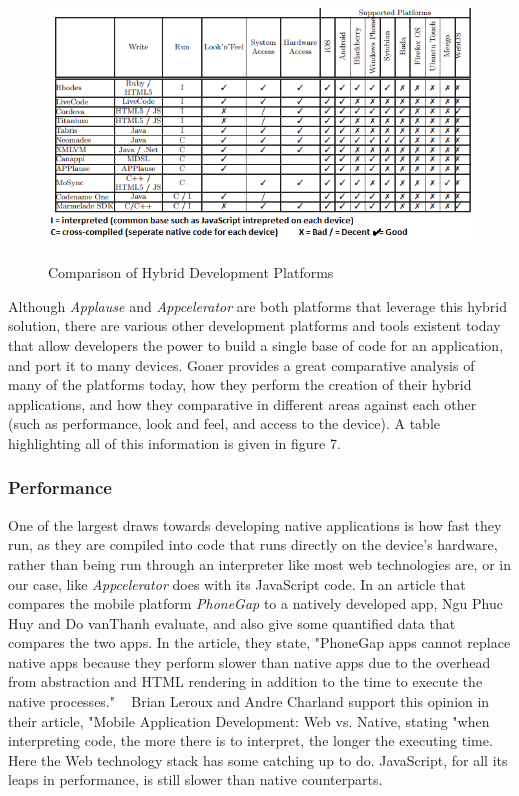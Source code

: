 \documentclass[11pt, twocolumn]{article}
\begin{document}
\begin{figure}
\includegraphics[width=\textwidth, height=7cm]{cross-platform-chart}
\caption{Comparison of Hybrid Development Platforms ~\cite{Goaer2013}}
\end{figure}

Although {\it Applause} and {\it Appcelerator} are both platforms that leverage this hybrid solution, there are various other development platforms and tools existent today that allow developers the power to build a single base of code for an application, and port it to many devices.  Goaer provides a great comparative analysis of many of the platforms today, how they perform the creation of their hybrid applications, and how they comparative in different areas against each other (such as performance, look and feel, and access to the device).  A table highlighting all of this information is given in figure 7. \\

\subsubsection{Performance}
One of the largest draws towards developing native applications is how fast they run, as they are compiled into code that runs directly on the device's hardware, rather than being run through an interpreter like most web technologies are, or in our case, like {\it Appcelerator} does with its JavaScript code.  In an article that compares the mobile platform {\it PhoneGap} to a natively developed app, Ngu Phuc Huy and Do vanThanh evaluate, and also give some quantified data that compares the two apps.  In the article, they state, "PhoneGap apps cannot replace native apps because they perform slower than native apps due to the overhead from abstraction and HTML rendering in addition to the time to execute the native processes." ~\cite{Huy2012}  Brian Leroux and Andre Charland support this opinion in their article, "Mobile Application Development: Web vs. Native, stating "when interpreting code, the more there is to interpret, the longer the executing time.  Here the Web technology stack has some catching up to do.  JavaScript, for all its leaps in performance, is still slower than native counterparts. ~\cite{Leroux2011} \\
\end{document}
